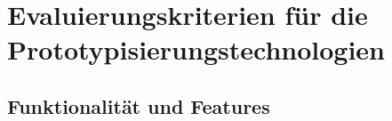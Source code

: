 \chapter{Evaluierungskriterien für die Prototypisierungstechnologien}\label{sec:funktionalitaet-features}
\section{Funktionalität und Features}